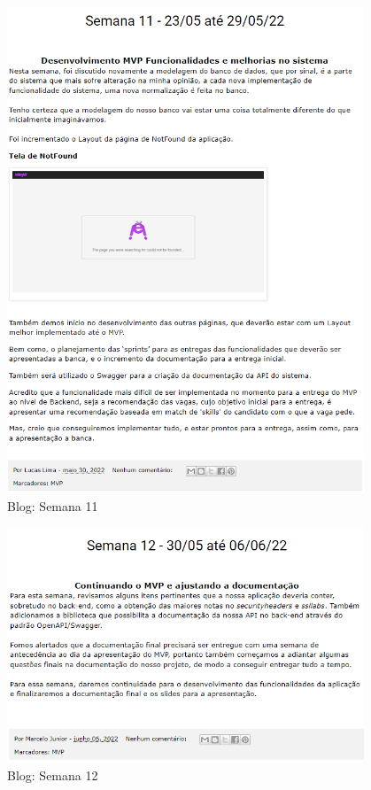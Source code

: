 \begin{apendicesenv}
\begin{figure}[H]
\end{figure}
\begin{figure}[H]
	\centering
	\caption{Blog: Semana 11}
	\includegraphics[width=0.95\textwidth]{../imagens/blog-posts/semana11.png}
\end{figure}
\begin{figure}[H]
	\centering
	\caption{Blog: Semana 12}
	\includegraphics[width=0.95\textwidth]{../imagens/blog-posts/semana12.png}
\end{figure}


\end{apendicesenv}
